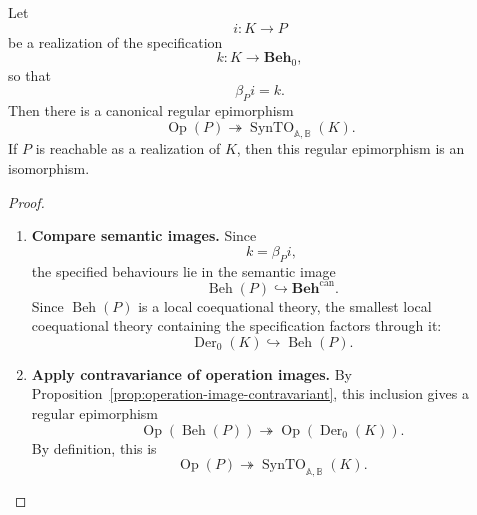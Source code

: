\begin{theorem}
\label{thm:recognizer-operation-quotient}
    Let
    \[
        i:K\to P
    \]
    be a realization of the specification
    \[
        k:K\to\mathbf{Beh}_0,
    \]
    so that
    \[
        \beta_P i=k.
    \]
    Then there is a canonical regular epimorphism
    \[
        \operatorname{Op}(P)
        \twoheadrightarrow
        \operatorname{SynTO}_{\mathbb A,\mathbb B}(K).
    \]
    If \(P\) is reachable as a realization of \(K\), then this regular
    epimorphism is an isomorphism.
\end{theorem}

\begin{proof}
    \leavevmode
    \begin{enumerate}
        \item \textbf{Compare semantic images.}
        Since
        \[
            k=\beta_P i,
        \]
        the specified behaviours lie in the semantic image
        \[
            \operatorname{Beh}(P)\hookrightarrow\mathbf{Beh}^{\mathrm{can}}.
        \]
        Since \(\operatorname{Beh}(P)\) is a local coequational theory, the
        smallest local coequational theory containing the specification factors
        through it:
        \[
            \operatorname{Der}_0(K)\hookrightarrow \operatorname{Beh}(P).
        \]

        \item \textbf{Apply contravariance of operation images.}
        By Proposition~\ref{prop:operation-image-contravariant}, this inclusion
        gives a regular epimorphism
        \[
            \operatorname{Op}(\operatorname{Beh}(P))
            \twoheadrightarrow
            \operatorname{Op}(\operatorname{Der}_0(K)).
        \]
        By definition, this is
        \[
            \operatorname{Op}(P)
            \twoheadrightarrow
            \operatorname{SynTO}_{\mathbb A,\mathbb B}(K).
        \]


\end{enumerate}
\end{proof}
